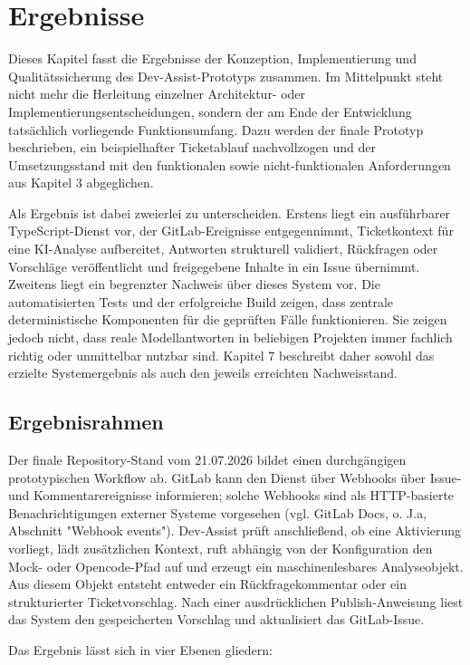 \chapter{Ergebnisse}

Dieses Kapitel fasst die Ergebnisse der Konzeption, Implementierung und Qualitätssicherung des Dev-Assist-Prototyps zusammen. Im Mittelpunkt steht nicht mehr die Herleitung einzelner Architektur- oder Implementierungsentscheidungen, sondern der am Ende der Entwicklung tatsächlich vorliegende Funktionsumfang. Dazu werden der finale Prototyp beschrieben, ein beispielhafter Ticketablauf nachvollzogen und der Umsetzungsstand mit den funktionalen sowie nicht-funktionalen Anforderungen aus Kapitel 3 abgeglichen.

Als Ergebnis ist dabei zweierlei zu unterscheiden. Erstens liegt ein ausführbarer TypeScript-Dienst vor, der GitLab-Ereignisse entgegennimmt, Ticketkontext für eine KI-Analyse aufbereitet, Antworten strukturell validiert, Rückfragen oder Vorschläge veröffentlicht und freigegebene Inhalte in ein Issue übernimmt. Zweitens liegt ein begrenzter Nachweis über dieses System vor. Die automatisierten Tests und der erfolgreiche Build zeigen, dass zentrale deterministische Komponenten für die geprüften Fälle funktionieren. Sie zeigen jedoch nicht, dass reale Modellantworten in beliebigen Projekten immer fachlich richtig oder unmittelbar nutzbar sind. Kapitel 7 beschreibt daher sowohl das erzielte Systemergebnis als auch den jeweils erreichten Nachweisstand.

\section{Ergebnisrahmen}

Der finale Repository-Stand vom 21.07.2026 bildet einen durchgängigen prototypischen Workflow ab. GitLab kann den Dienst über Webhooks über Issue- und Kommentarereignisse informieren; solche Webhooks sind als HTTP-basierte Benachrichtigungen externer Systeme vorgesehen (vgl. GitLab Docs, o. J.a, Abschnitt "Webhook events"). Dev-Assist prüft anschließend, ob eine Aktivierung vorliegt, lädt zusätzlichen Kontext, ruft abhängig von der Konfiguration den Mock- oder Opencode-Pfad auf und erzeugt ein maschinenlesbares Analyseobjekt. Aus diesem Objekt entsteht entweder ein Rückfragekommentar oder ein strukturierter Ticketvorschlag. Nach einer ausdrücklichen Publish-Anweisung liest das System den gespeicherten Vorschlag und aktualisiert das GitLab-Issue.

Das Ergebnis lässt sich in vier Ebenen gliedern:

